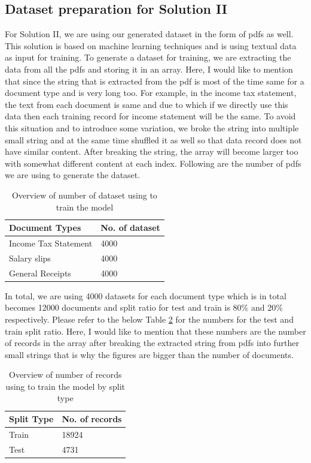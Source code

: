 \subsection{Dataset preparation for Solution II}
For Solution II, we are using our generated dataset in the form of pdfs as well. This solution is based on machine learning techniques and is using textual data as input for training. To generate a dataset for training, we are extracting the data from all the pdfs and storing it in an array. Here, I would like to mention that since the string that is extracted from the pdf is most of the time same for a document type and is very long too. For example, in the income tax statement, the text from each document is same and due to which if we directly use this data then each training record for income statement will be the same. To avoid this situation and to introduce some variation, we broke the string into multiple small string and at the same time shuffled it as well so that data record does not have similar content. After breaking the string, the array will become larger too with somewhat different content at each index. Following are the number of pdfs we are using to generate the dataset. 
\begin{table}[H]
\centering
\begin{tabular}{l | l }
Document Types & No. of dataset\\
\hline
Income Tax Statement & 4000 \\
Salary slips & 4000 \\
General Receipts & 4000
\end{tabular}
\caption{Overview of number of dataset using to train the model}
\label{dataset_count_sol2}
\end{table}
\par
In total, we are using 4000 datasets for each document type which is in total becomes 12000 documents and split ratio for test and train is 80\% and 20\% respectively. Please refer to the below Table \ref{record_count_sol2} for the numbers for the test and train split ratio. Here, I would like to mention that these numbers are the number of records in the array after breaking the extracted string from pdfs into further small strings that is why the figures are bigger than the number of documents.
\begin{table}[H]
\centering
\begin{tabular}{l | l }
Split Type & No. of records\\
\hline
Train & 18924 \\
Test & 4731
\end{tabular}
\caption{Overview of number of records using to train the model by split type}
\label{record_count_sol2}
\end{table}

